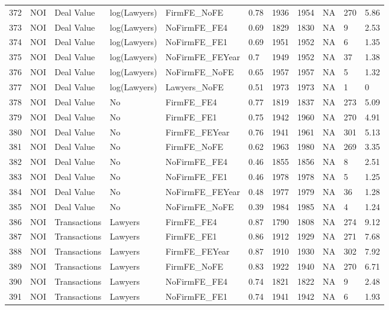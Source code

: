 \documentclass{article}
\begin{document}
\begin{table}[H]
\begin{tabular}{rllllllllll}
  372 & NOI & Deal Value & log(Lawyers) & FirmFE\_NoFE & 0.78 & 1936 & 1954 & NA & 270 & 5.86 \\ 
  373 & NOI & Deal Value & log(Lawyers) & NoFirmFE\_FE4 & 0.69 & 1829 & 1830 & NA & 9 & 2.53 \\ 
  374 & NOI & Deal Value & log(Lawyers) & NoFirmFE\_FE1 & 0.69 & 1951 & 1952 & NA & 6 & 1.35 \\ 
  375 & NOI & Deal Value & log(Lawyers) & NoFirmFE\_FEYear & 0.7 & 1949 & 1952 & NA & 37 & 1.38 \\ 
  376 & NOI & Deal Value & log(Lawyers) & NoFirmFE\_NoFE & 0.65 & 1957 & 1957 & NA & 5 & 1.32 \\ 
  377 & NOI & Deal Value & log(Lawyers) & Lawyers\_NoFE & 0.51 & 1973 & 1973 & NA & 1 & 0 \\ 
  378 & NOI & Deal Value & No & FirmFE\_FE4 & 0.77 & 1819 & 1837 & NA & 273 & 5.09 \\ 
  379 & NOI & Deal Value & No & FirmFE\_FE1 & 0.75 & 1942 & 1960 & NA & 270 & 4.91 \\ 
  380 & NOI & Deal Value & No & FirmFE\_FEYear & 0.76 & 1941 & 1961 & NA & 301 & 5.13 \\ 
  381 & NOI & Deal Value & No & FirmFE\_NoFE & 0.62 & 1963 & 1980 & NA & 269 & 3.35 \\ 
  382 & NOI & Deal Value & No & NoFirmFE\_FE4 & 0.46 & 1855 & 1856 & NA & 8 & 2.51 \\ 
  383 & NOI & Deal Value & No & NoFirmFE\_FE1 & 0.46 & 1978 & 1978 & NA & 5 & 1.25 \\ 
  384 & NOI & Deal Value & No & NoFirmFE\_FEYear & 0.48 & 1977 & 1979 & NA & 36 & 1.28 \\ 
  385 & NOI & Deal Value & No & NoFirmFE\_NoFE & 0.39 & 1984 & 1985 & NA & 4 & 1.24 \\ 
  386 & NOI & Transactions & Lawyers & FirmFE\_FE4 & 0.87 & 1790 & 1808 & NA & 274 & 9.12 \\ 
  387 & NOI & Transactions & Lawyers & FirmFE\_FE1 & 0.86 & 1912 & 1929 & NA & 271 & 7.68 \\ 
  388 & NOI & Transactions & Lawyers & FirmFE\_FEYear & 0.87 & 1910 & 1930 & NA & 302 & 7.92 \\ 
  389 & NOI & Transactions & Lawyers & FirmFE\_NoFE & 0.83 & 1922 & 1940 & NA & 270 & 6.71 \\ 
  390 & NOI & Transactions & Lawyers & NoFirmFE\_FE4 & 0.74 & 1821 & 1822 & NA & 9 & 2.48 \\ 
  391 & NOI & Transactions & Lawyers & NoFirmFE\_FE1 & 0.74 & 1941 & 1942 & NA & 6 & 1.93 \\ 

\end{tabular}
\end{table}
\end{document}
